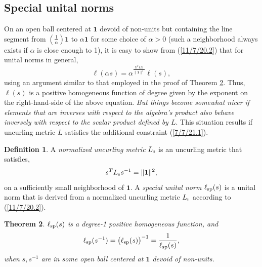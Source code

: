 \documentclass{amsart}
\numberwithin{equation}{section}
\newtheorem{theorem}{Theorem}
\theoremstyle{definition}
\newtheorem{definition}[theorem]{Definition}
\numberwithin{theorem}{section}
\begin{document}
\subsection{Special unital norms} 
On an open ball centered at $\mathbf{1}$ devoid of non-units but containing the line segment from $\left(\frac{1}{\alpha}\right)\mathbf{1}$ to $\alpha\mathbf{1}$ for some choice of $\alpha>0$ (such a neighborhood always exists if $\alpha$ is close enough to 1), it is easy to show from (\ref{11/7/20.2}) that for unital norms in general,  \[  \ell(\alpha s) = \alpha^{\frac{\mathbf{1}^T L \mathbf{1}}{\|\mathbf{1}\|^2}} \ell(s),\] using an argument similar to that employed in the proof of Theorem \ref{9/24/23.1}. Thus, $ \ell(s)$ is a positive homogeneous function of degree given by the exponent on the right-hand-side of the above equation.  
   {\it But things become somewhat nicer if elements that are inverses with respect to the algebra's product also behave inversely with respect to the scalar product defined by $L$}.  
    This situation results if uncurling metric $L$ satisfies the additional constraint (\ref{7/7/21.1}).

    \begin{definition}\label{9/20/23.1} A {\it normalized uncurling metric} $L_{\shortparallel}$ is an uncurling metric that satisfies, \begin{equation} \label{7/7/21.1} s^TL_{\shortparallel} s^{-1} =\|{\bf 1}\|^2,\end{equation} on a sufficiently small neighborhood of $\mathbf{1}$.   A {\it special unital norm} $\ell_{\rm sp}(s)$ is a unital norm that is derived from a normalized uncurling metric $L_{\shortparallel}$ according to (\ref{11/7/20.2}). 
\end{definition}


\begin{theorem}\label{9/24/23.1} $ \ell_{\rm sp}(s)$ is a degree-1 positive homogeneous function, and
\begin{equation}\label{5/23/23.3}  \ell_{\rm sp}(s^{-1}) = \big(\ell_{\rm sp}(s)\big)^{-1} = \frac{1}{\ell_{\rm sp}(s)}, \end{equation} when $s,s^{-1}$ are in some open ball centered at $\mathbf{1}$ devoid of non-units. \end{theorem}
\end{document}
